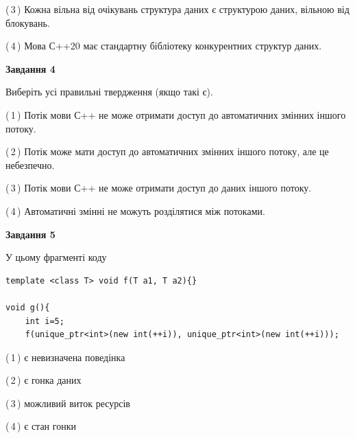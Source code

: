\documentclass[12pt, ukrainian]{article}
\begin{document}
\begin {large}
{(\,3\,) Кожна вільна від очікувань структура даних є структурою даних, вільною від блокувань.%

(\,4\,) Мова С++20 має стандартну бібліотеку конкурентних структур даних.%



\begin{center}
\textbf{Завдання 4}
\end{center}
Виберіть усі правильні твердження (якщо такі є).\par
\vspace{2mm}

(\,1\,) Потік мови С++ не може отримати доступ до автоматичних змінних іншого потоку.%

(\,2\,) Потік може мати доступ до автоматичних змінних іншого потоку, але це небезпечно.%

(\,3\,) Потік мови С++ не може отримати доступ до даних іншого потоку.%

(\,4\,) Автоматичні змінні не можуть розділятися між потоками.%



\begin{center}
\textbf{Завдання 5}
\end{center}
У цьому фрагменті коду
\begin{verbatim}
template <class T> void f(T a1, T a2){}

void g(){
    int i=5;
    f(unique_ptr<int>(new int(++i)), unique_ptr<int>(new int(++i)));
\end{verbatim}

(\,1\,) є невизначена поведінка%

(\,2\,) є гонка даних%

(\,3\,) можливий виток ресурсів%

(\,4\,) є стан гонки%


}
\end {large}
\end{document}
